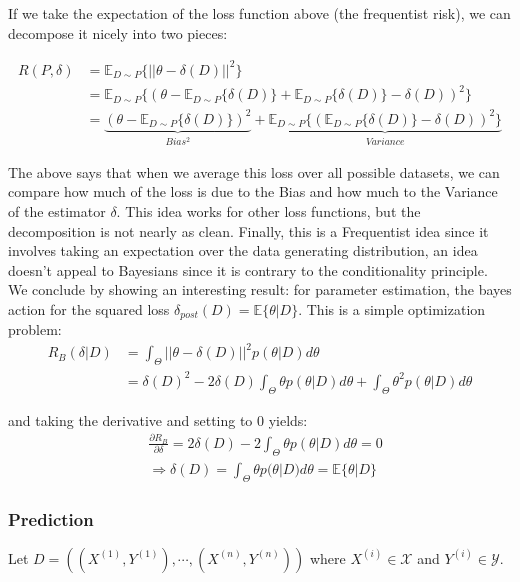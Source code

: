 \documentclass[]{article}
\theoremstyle{mattstyle}
\theoremstyle{definition}
\begin{document}
If we take the expectation of the loss function above (the frequentist risk), we can decompose it nicely into two pieces:

\begin{align*}
R(P,\delta)&=\mathbb{E}_{D\sim P}\{||\theta-\delta(D)||^2\}\\
&=\mathbb{E}_{D\sim P}\{(\theta-\mathbb{E}_{D\sim P}\{\delta(D)\} + \mathbb{E}_{D\sim P}\{\delta(D)\} - \delta(D))^2\}\\
&=\underbrace{(\theta-\mathbb{E}_{D\sim P}\{\delta(D)\})^2}_{Bias^2} + \underbrace{\mathbb{E}_{D\sim P}\{(\mathbb{E}_{D\sim P}\{\delta(D)\} - \delta(D))^2\}}_{Variance}
\end{align*}

The above says that when we average this loss over all possible datasets, we can compare how much of the loss is due to the Bias and how much to the Variance of the estimator $\delta$. This idea works for other loss functions, but the decomposition is not nearly as clean. Finally, this is a Frequentist idea since it involves taking an expectation over the data generating distribution, an idea doesn't appeal to Bayesians since it is contrary to the conditionality principle. 
\\

We conclude by showing an interesting result: for parameter estimation, the bayes action for the squared loss
\(\delta_{post}(D) = \mathbb{E}\{\theta|D\}\). This is a simple optimization problem:
\begin{align*}
R_B(\delta|D) &= \int_{\Theta}^{}||\theta-\delta(D)||^2p(\theta|D)d\theta \\
&=\delta(D)^2 -2\delta(D)\int_{\Theta}^{}\theta p(\theta|D)d\theta+\int_{\Theta}^{}\theta^2 p(\theta|D)d\theta
\end{align*}

and taking the derivative and setting to 0 yields:
\begin{align*}
&\frac{\partial R_B}{\partial \delta} = 2\delta(D) -2\int_{\Theta}^{}\theta p(\theta|D)d\theta = 0 \\
&\Rightarrow \delta(D) = \int_{\Theta}^{}\theta p(\theta|D)d\theta = \mathbb{E}\{\theta|D\}
\end{align*}

\newpage

\subsubsection{Prediction}
Let $D=((X^{(1)},Y^{(1)}), \cdots, (X^{(n)},Y^{(n)}))$ where $X^{(i)} \in \mathcal{X}$ and $Y^{(i)} \in \mathcal{Y}$. 
\end{document}
